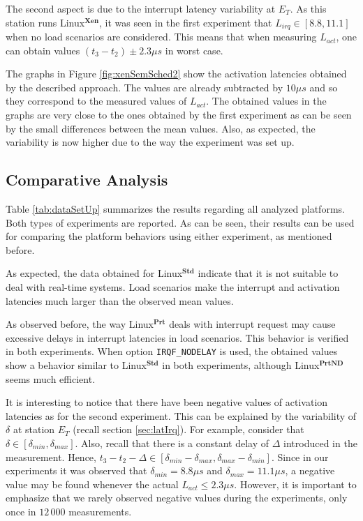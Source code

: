 \documentclass{acm_proc_article-sp}
\newcommand{\cod}[1]{\hspace{0.1cm}\texttt{#1}}
\begin{document}
The second aspect is due to the interrupt latency variability at $E_T$. As this
station runs Linux$^\mathbf{Xen}$, it was seen in the first experiment that $L_{irq}
\in [8.8,11.1]$ when no load scenarios are considered. This means that when
measuring $L_{act}$, one can obtain values $(t_3 - t_2) \pm 2.3 \mu s$ in worst
case.

The graphs in Figure \ref{fig:xenSemSched2} show the activation latencies obtained
by the described approach. The values are already subtracted by $10 \mu s$ and so
they correspond to the measured values of $L_{act}$. The obtained values in
the graphs are very close to the ones obtained by the first experiment as can be
seen by the small differences between the mean values. Also, as expected, the variability
is now higher due to the way the experiment was set up.

\subsection{Comparative Analysis}
\label{sec:compTable}

Table \ref{tab:dataSetUp} summarizes the results regarding all analyzed platforms.
Both types of experiments are reported. As can be seen, their results can be used
for comparing the platform behaviors using either experiment, as mentioned before.

As expected, the data obtained for Linux$^\mathbf{Std}$ indicate that it is not
suitable to deal with real-time systems. Load scenarios make the interrupt and
activation latencies much larger than the observed mean values.

As observed before, the way Linux$^\mathbf{Prt}$ deals with interrupt request may
cause excessive delays in interrupt latencies in load scenarios. This behavior is
verified in both experiments. When option \cod{IRQF\_NODELAY} is used, the
obtained values show a behavior similar to Linux$^\mathbf{Std}$ in both experiments,
although Linux$^\mathbf{PrtND}$ seems much efficient.

It is interesting to notice that there have been negative values of activation
latencies as for the second experiment.  This can be explained by the variability of
$\delta$ at station $E_T$ (recall section \ref{sec:latIrq}).  For example, consider
that $\delta \in [\delta_{min},\delta_{max}]$. Also, recall that there is a constant
delay of $\Delta$ introduced in the measurement. Hence, $t_3 - t_2 - \Delta \in
[\delta_{min}-\delta_{max},\delta_{max}-\delta_{min}]$. Since in our experiments it
was observed that $\delta_{min} = 8.8 \mu s$ and $\delta_{max} = 11.1 \mu s$, a
negative value may be found whenever the actual $L_{act} \leq 2.3 \mu s$. However,
it is important to emphasize that we rarely observed negative values during the
experiments, only once in $12\,000$ measurements.
\end{document}
